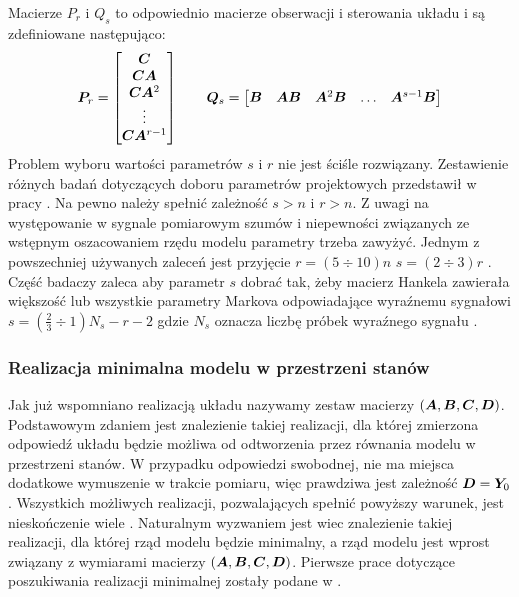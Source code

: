 Macierze $P_r$ i $Q_s$ to odpowiednio macierze obserwacji i sterowania układu i są zdefiniowane następująco:
\begin{equation}
	\bm{P}_r = \begin{bmatrix}
		\bm{C} \\ 
		\bm{CA} \\
		\bm{CA}^2\\
		\vdots \\
		\bm{CA}^{r-1}\\
	\end{bmatrix}
	\qquad
	\bm{Q}_s = \begin{bmatrix}
		\bm{B} & \bm{AB} & \bm{A}^2\bm{B} & \dots & \bm{A}^{s-1}\bm{B}    
	\end{bmatrix}	
\end{equation}
Problem wyboru wartości parametrów $s$ i $r$ nie jest ściśle rozwiązany. Zestawienie różnych badań dotyczących doboru parametrów projektowych przedstawił w pracy \cite{Szafranski2013}. Na pewno należy spełnić zależność $s>n$ i $r>n$. Z uwagi na występowanie w sygnale pomiarowym szumów i niepewności związanych ze wstępnym oszacowaniem rzędu modelu parametry trzeba zawyżyć. Jednym z powszechniej używanych zaleceń jest przyjęcie $r=(5\div10)n$ $s=(2\div3)r$ \parencite{Dudek2008}. Część badaczy zaleca aby parametr $s$ dobrać tak, żeby macierz Hankela zawierała większość lub wszystkie parametry Markova odpowiadające wyraźnemu sygnałowi $s = (\frac{2}{3}\div 1)N_s-r-2$ gdzie $N_s$ oznacza liczbę próbek wyraźnego sygnału \parencite{Caicedo2011,Nayeri2009}.

\subsubsection{Realizacja minimalna modelu w przestrzeni stanów}

Jak już wspomniano realizacją układu nazywamy zestaw macierzy $(\bm{A},\bm{B},\bm{C},\bm{D})$. Podstawowym zdaniem jest znalezienie takiej realizacji, dla której zmierzona odpowiedź układu będzie możliwa od odtworzenia przez równania modelu w przestrzeni stanów. W przypadku odpowiedzi swobodnej, nie ma miejsca dodatkowe wymuszenie w trakcie pomiaru, więc prawdziwa jest zależność $\bm{D}=\bm{Y}_0$. Wszystkich możliwych realizacji, pozwalających spełnić powyższy warunek, jest nieskończenie wiele \parencite{Juang1985}. Naturalnym wyzwaniem jest wiec znalezienie takiej realizacji, dla której rząd modelu będzie minimalny, a rząd modelu jest wprost związany z wymiarami macierzy $(\bm{A},\bm{B},\bm{C},\bm{D})$. Pierwsze prace dotyczące poszukiwania realizacji minimalnej zostały podane w \parencite{Kalman1963,Ho1966}.

